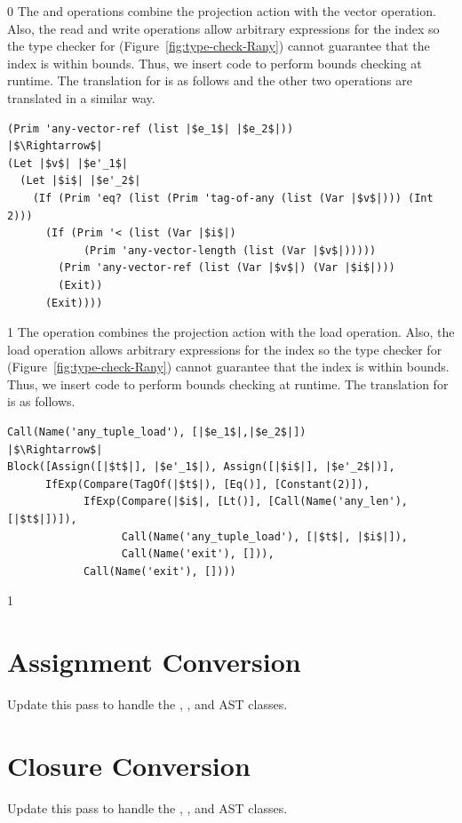 \documentclass[7x10,nocrop]{TimesAPriori_MIT}%
\def\racketEd{0}
\def\pythonEd{1}
\def\edition{0}
\begin{document}
{\if\edition\racketEd    
The  and  operations
combine the projection action with the vector operation.  Also, the
read and write operations allow arbitrary expressions for the index so
the type checker for \LangAny{} (Figure~\ref{fig:type-check-Rany})
cannot guarantee that the index is within bounds. Thus, we insert code
to perform bounds checking at runtime. The translation for
 is as follows and the other two operations are
translated in a similar way.

\begin{lstlisting}
(Prim 'any-vector-ref (list |$e_1$| |$e_2$|))
|$\Rightarrow$|
(Let |$v$| |$e'_1$|
  (Let |$i$| |$e'_2$|
    (If (Prim 'eq? (list (Prim 'tag-of-any (list (Var |$v$|))) (Int 2)))
      (If (Prim '< (list (Var |$i$|)
            (Prim 'any-vector-length (list (Var |$v$|)))))
        (Prim 'any-vector-ref (list (Var |$v$|) (Var |$i$|)))
        (Exit))
      (Exit))))
\end{lstlisting}
\fi}
%
{\if\edition\pythonEd
%
The  operation combines the projection action
with the load operation.  Also, the load operation allows arbitrary
expressions for the index so the type checker for \LangAny{}
(Figure~\ref{fig:type-check-Rany}) cannot guarantee that the index is
within bounds. Thus, we insert code to perform bounds checking at
runtime. The translation for  is as follows.

\begin{lstlisting}
Call(Name('any_tuple_load'), [|$e_1$|,|$e_2$|])
|$\Rightarrow$|
Block([Assign([|$t$|], |$e'_1$|), Assign([|$i$|], |$e'_2$|)],
      IfExp(Compare(TagOf(|$t$|), [Eq()], [Constant(2)]),
            IfExp(Compare(|$i$|, [Lt()], [Call(Name('any_len'), [|$t$|])]),
                  Call(Name('any_tuple_load'), [|$t$|, |$i$|]),
                  Call(Name('exit'), [])),
            Call(Name('exit'), [])))
\end{lstlisting}
\fi}


{\if\edition\pythonEd

\section{Assignment Conversion}
\label{sec:convert-assignments-Lany}

Update this pass to handle the , , and
 AST classes.

\section{Closure Conversion}
\label{sec:closure-conversion-Lany}

Update this pass to handle the , , and
 AST classes.

\fi}
\end{document}
